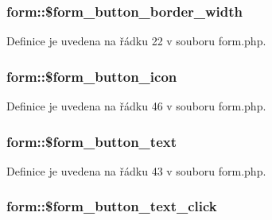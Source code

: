 \hypertarget{classform_a1fcc0c6c54448868422b196600d0c5c0}{
\subsubsection[{\$form\-\_\-button\-\_\-border\-\_\-width}]{\setlength{\rightskip}{0pt plus 5cm}form\-::\$form\-\_\-button\-\_\-border\-\_\-width}}\label{classform_a1fcc0c6c54448868422b196600d0c5c0}


Definice je uvedena na řádku 22 v souboru form.\-php.

\hypertarget{classform_a37c3504b48d530720082d4b653ea2f5e}{
\subsubsection[{\$form\-\_\-button\-\_\-icon}]{\setlength{\rightskip}{0pt plus 5cm}form\-::\$form\-\_\-button\-\_\-icon}}\label{classform_a37c3504b48d530720082d4b653ea2f5e}


Definice je uvedena na řádku 46 v souboru form.\-php.

\hypertarget{classform_acd9cd61e2aa1ffa8fc8e069165902350}{
\subsubsection[{\$form\-\_\-button\-\_\-text}]{\setlength{\rightskip}{0pt plus 5cm}form\-::\$form\-\_\-button\-\_\-text}}\label{classform_acd9cd61e2aa1ffa8fc8e069165902350}


Definice je uvedena na řádku 43 v souboru form.\-php.

\hypertarget{classform_a04891117a1fa3474cb2592b03f489c83}{
\subsubsection[{\$form\-\_\-button\-\_\-text\-\_\-click}]{\setlength{\rightskip}{0pt plus 5cm}form\-::\$form\-\_\-button\-\_\-text\-\_\-click}}\label{classform_a04891117a1fa3474cb2592b03f489c83}


